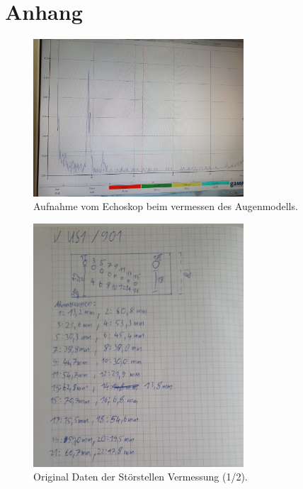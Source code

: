 \section{Anhang}

    \begin{figure}[h]
        \centering
        \includegraphics[width=0.7\textwidth]{latex/images/Auge_dat.jpeg}
        \caption{Aufnahme vom Echoskop beim vermessen des Augenmodells.}
        \label{img:Auge_dat}
    \end{figure}

    \begin{figure}[h]
        \centering
        \includegraphics[width=0.7\textwidth]{latex/images/Original_Daten_1.jpeg}
        \caption{Original Daten der Störstellen Vermessung (1/2).}
    \end{figure}

